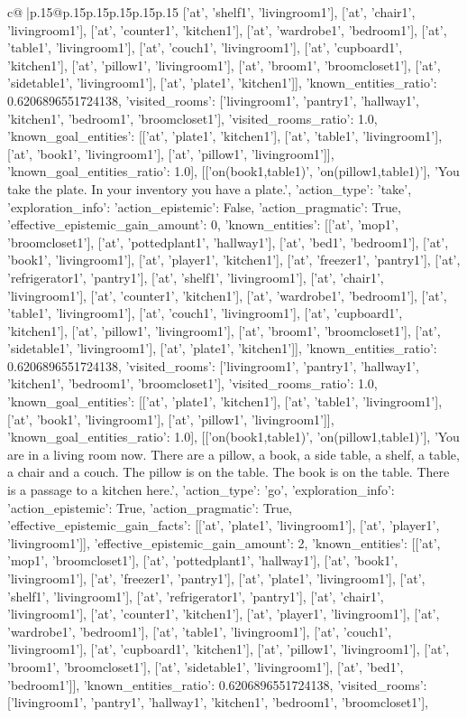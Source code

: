 \documentclass{article}
\begin{document}
{\begin{supertabular}{c@{$\;$}|p{.15\linewidth}@{}p{.15\linewidth}p{.15\linewidth}p{.15\linewidth}p{.15\linewidth}p{.15\linewidth}}
{{{['at', 'shelf1', 'livingroom1'], ['at', 'chair1', 'livingroom1'], ['at', 'counter1', 'kitchen1'], ['at', 'wardrobe1', 'bedroom1'], ['at', 'table1', 'livingroom1'], ['at', 'couch1', 'livingroom1'], ['at', 'cupboard1', 'kitchen1'], ['at', 'pillow1', 'livingroom1'], ['at', 'broom1', 'broomcloset1'], ['at', 'sidetable1', 'livingroom1'], ['at', 'plate1', 'kitchen1']], 'known_entities_ratio': 0.6206896551724138, 'visited_rooms': ['livingroom1', 'pantry1', 'hallway1', 'kitchen1', 'bedroom1', 'broomcloset1'], 'visited_rooms_ratio': 1.0, 'known_goal_entities': [['at', 'plate1', 'kitchen1'], ['at', 'table1', 'livingroom1'], ['at', 'book1', 'livingroom1'], ['at', 'pillow1', 'livingroom1']], 'known_goal_entities_ratio': 1.0}}], [['on(book1,table1)', 'on(pillow1,table1)'], 'You take the plate. In your inventory you have a plate.', {'action_type': 'take', 'exploration_info': {'action_epistemic': False, 'action_pragmatic': True, 'effective_epistemic_gain_amount': 0, 'known_entities': [['at', 'mop1', 'broomcloset1'], ['at', 'pottedplant1', 'hallway1'], ['at', 'bed1', 'bedroom1'], ['at', 'book1', 'livingroom1'], ['at', 'player1', 'kitchen1'], ['at', 'freezer1', 'pantry1'], ['at', 'refrigerator1', 'pantry1'], ['at', 'shelf1', 'livingroom1'], ['at', 'chair1', 'livingroom1'], ['at', 'counter1', 'kitchen1'], ['at', 'wardrobe1', 'bedroom1'], ['at', 'table1', 'livingroom1'], ['at', 'couch1', 'livingroom1'], ['at', 'cupboard1', 'kitchen1'], ['at', 'pillow1', 'livingroom1'], ['at', 'broom1', 'broomcloset1'], ['at', 'sidetable1', 'livingroom1'], ['at', 'plate1', 'kitchen1']], 'known_entities_ratio': 0.6206896551724138, 'visited_rooms': ['livingroom1', 'pantry1', 'hallway1', 'kitchen1', 'bedroom1', 'broomcloset1'], 'visited_rooms_ratio': 1.0, 'known_goal_entities': [['at', 'plate1', 'kitchen1'], ['at', 'table1', 'livingroom1'], ['at', 'book1', 'livingroom1'], ['at', 'pillow1', 'livingroom1']], 'known_goal_entities_ratio': 1.0}}], [['on(book1,table1)', 'on(pillow1,table1)'], 'You are in a living room now. There are a pillow, a book, a side table, a shelf, a table, a chair and a couch. The pillow is on the table. The book is on the table. There is a passage to a kitchen here.', {'action_type': 'go', 'exploration_info': {'action_epistemic': True, 'action_pragmatic': True, 'effective_epistemic_gain_facts': [['at', 'plate1', 'livingroom1'], ['at', 'player1', 'livingroom1']], 'effective_epistemic_gain_amount': 2, 'known_entities': [['at', 'mop1', 'broomcloset1'], ['at', 'pottedplant1', 'hallway1'], ['at', 'book1', 'livingroom1'], ['at', 'freezer1', 'pantry1'], ['at', 'plate1', 'livingroom1'], ['at', 'shelf1', 'livingroom1'], ['at', 'refrigerator1', 'pantry1'], ['at', 'chair1', 'livingroom1'], ['at', 'counter1', 'kitchen1'], ['at', 'player1', 'livingroom1'], ['at', 'wardrobe1', 'bedroom1'], ['at', 'table1', 'livingroom1'], ['at', 'couch1', 'livingroom1'], ['at', 'cupboard1', 'kitchen1'], ['at', 'pillow1', 'livingroom1'], ['at', 'broom1', 'broomcloset1'], ['at', 'sidetable1', 'livingroom1'], ['at', 'bed1', 'bedroom1']], 'known_entities_ratio': 0.6206896551724138, 'visited_rooms': ['livingroom1', 'pantry1', 'hallway1', 'kitchen1', 'bedroom1', 'broomcloset1'], }}}
\end{supertabular}}
\end{document}
